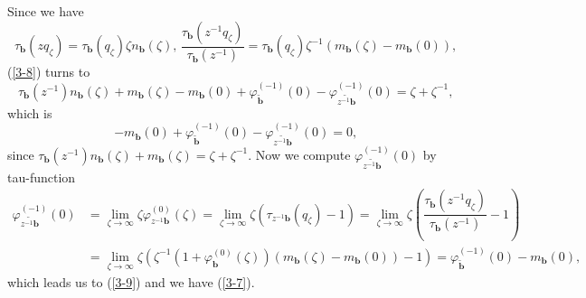 \documentclass[a4paper]{article}%
\begin{document}
Since we have%
\[
\tau_{\boldsymbol{b}}\left(  zq_{\zeta}\right)  =\tau_{\boldsymbol{b}}\left(
q_{\zeta}\right)  \zeta n_{\boldsymbol{b}}\left(  \zeta\right)  \text{,
\ }\dfrac{\tau_{\boldsymbol{b}}\left(  z^{-1}q_{\zeta}\right)  }%
{\tau_{\boldsymbol{b}}\left(  z^{-1}\right)  }=\tau_{\boldsymbol{b}}\left(
q_{\zeta}\right)  \zeta^{-1}\left(  m_{\boldsymbol{b}}\left(  \zeta\right)
-m_{\boldsymbol{b}}\left(  0\right)  \right)  \text{,}%
\]
(\ref{3-8}) turns to%
\[
\tau_{\boldsymbol{b}}\left(  z^{-1}\right)  n_{\boldsymbol{b}}\left(
\zeta\right)  +m_{\boldsymbol{b}}\left(  \zeta\right)  -m_{\boldsymbol{b}%
}\left(  0\right)  +\varphi_{\widetilde{\boldsymbol{b}}}^{\left(  -1\right)
}\left(  0\right)  -\varphi_{\widetilde{z^{-1}\boldsymbol{b}}}^{\left(
-1\right)  }\left(  0\right)  =\zeta+\zeta^{-1}\text{,}%
\]
which is%
\begin{equation}
-m_{\boldsymbol{b}}\left(  0\right)  +\varphi_{\widetilde{\boldsymbol{b}}%
}^{\left(  -1\right)  }\left(  0\right)  -\varphi_{\widetilde{z^{-1}%
\boldsymbol{b}}}^{\left(  -1\right)  }\left(  0\right)  =0\text{,} \label{3-9}%
\end{equation}
since $\tau_{\boldsymbol{b}}\left(  z^{-1}\right)  n_{\boldsymbol{b}}\left(
\zeta\right)  +m_{\boldsymbol{b}}\left(  \zeta\right)  =\zeta+\zeta^{-1}$. Now
we compute $\varphi_{\widetilde{z^{-1}\boldsymbol{b}}}^{\left(  -1\right)
}\left(  0\right)  $ by tau-function
\begin{align*}
\varphi_{\widetilde{z^{-1}\boldsymbol{b}}}^{\left(  -1\right)  }\left(
0\right)   &  =\lim_{\zeta\rightarrow\infty}\zeta\varphi_{z^{-1}%
\boldsymbol{b}}^{\left(  0\right)  }\left(  \zeta\right)  =\lim_{\zeta
\rightarrow\infty}\zeta\left(  \tau_{z^{-1}\boldsymbol{b}}\left(  q_{\zeta
}\right)  -1\right)  =\lim_{\zeta\rightarrow\infty}\zeta\left(  \dfrac
{\tau_{\boldsymbol{b}}\left(  z^{-1}q_{\zeta}\right)  }{\tau_{\boldsymbol{b}%
}\left(  z^{-1}\right)  }-1\right) \\
&  =\lim_{\zeta\rightarrow\infty}\zeta\left(  \zeta^{-1}\left(  1+\varphi
_{\boldsymbol{b}}^{\left(  0\right)  }\left(  \zeta\right)  \right)  \left(
m_{\boldsymbol{b}}\left(  \zeta\right)  -m_{\boldsymbol{b}}\left(  0\right)
\right)  -1\right)  =\varphi_{\widetilde{\boldsymbol{b}}}^{\left(  -1\right)
}\left(  0\right)  -m_{\boldsymbol{b}}\left(  0\right)  \text{,}%
\end{align*}
which leads us to (\ref{3-9}) and we have (\ref{3-7}).
\end{document}
